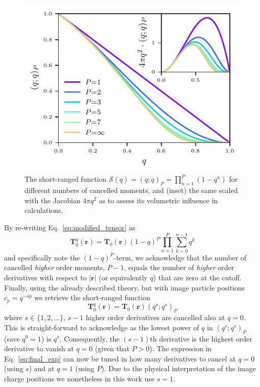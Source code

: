 \documentclass[
journal=jctcce,
manuscript=letter]{achemso}
\begin{document}
\begin{figure}[ht]
\centering
   \includegraphics[width=0.8\columnwidth]{qPochhammer.pdf}
\caption{The short-ranged function $\mathcal{S}(q)=(q;q)_P=\prod_{n=1}^P(1-q^n)$ for different numbers of cancelled moments, and (inset) the same scaled with the Jacobian $4\pi q^2$ as to assess its volumetric influence in calculations. }
\label{fig:Pochhammer} 
\end{figure}

By re-writing Eq.~\ref{eq:modified_tensor} as
\begin{equation}
\boldsymbol{T}^{q}_0(\boldsymbol{r}) = \boldsymbol{T}_0(\boldsymbol{r})(1-q)^P\prod_{n=1}^{P}\sum_{k=0}^{n-1}q^k
\end{equation}
and specifically note the $(1-q)^P$-term, we acknowledge that the number of cancelled \emph{higher} order moments, $P-1$, equals the number of \emph{higher} order derivatives with respect to $|\boldsymbol{r}|$ (or equivalently $q$) that are zero at the cutoff.
Finally, using the already described theory, but with image particle positions $c_p=q^{-sp}$ we retrieve the short-ranged function
\begin{equation}\label{eq:final_exp}
\boldsymbol{T}^{q}_0(\boldsymbol{r}) = \boldsymbol{T}_0(\boldsymbol{r})(q^s;q^s)_{P}
\end{equation}
where $s\in\{1,2,...\}$, $s-1$ higher order derivatives are cancelled also at $q=0$. This is straight-forward to acknowledge as the lowest power of $q$ in $(q^s;q^s)_{P}$ (save $q^0=1$) is $q^s$. Consequently, the $(s-1)$th derivative is the highest order derivative to vanish at $q=0$ (given that $P>0$).
The expression in Eq.~\ref{eq:final_exp} can now be tuned in how many derivatives to cancel at $q=0$ (using $s$) and at $q=1$ (using $P$).
Due to the physical interpretation of the image charge positions\cite{tikhonov1963equations,friedman1975image} we nonetheless in this work use $s=1$.
\end{document}
